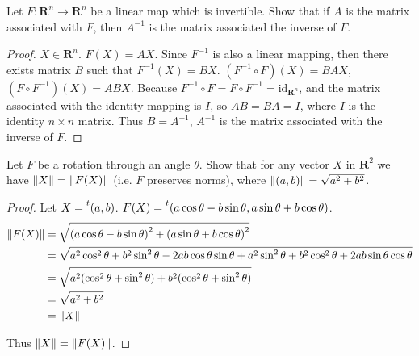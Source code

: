 \begin{exercise}
    Let $F: \mathbf{R}^{n} \to \mathbf{R}^{n}$ be a linear map which is invertible. Show that if $A$ is the matrix associated with $F$, then $A^{-1}$ is the matrix associated the inverse of $F$.
\end{exercise}

\begin{proof}
    $X\in\mathbf{R}^{n}$. $F(X) = AX$. Since $F^{-1}$ is also a linear mapping, then there exists matrix $B$ such that $F^{-1}(X) = BX$. $(F^{-1}\circ F)(X) = BAX$, $(F\circ F^{-1})(X) = ABX$. Because $F^{-1}\circ F = F\circ F^{-1} = \text{id}_{\mathbf{R}^{n}}$, and the matrix associated with the identity mapping is $I$, so $AB = BA = I$, where $I$ is the identity $n\times n$ matrix. Thus $B = A^{-1}$, $A^{-1}$ is the matrix associated with the inverse of $F$.
\end{proof}

\begin{exercise}
    Let $F$ be a rotation through an angle $\theta$. Show that for any vector $X$ in $\mathbf{R}^{2}$ we have $\left\Vert{X}\right\Vert = \left\Vert{F(X)}\right\Vert$ (i.e. $F$ preserves norms), where $\left\Vert{(a, b)}\right\Vert = \sqrt{a^{2} + b^{2}}$.
\end{exercise}

\begin{proof}
    Let $X = \prescript{t}{}(a, b)$. $F(X) = \prescript{t}{}(a\cos\theta - b\sin\theta, a\sin\theta + b\cos\theta)$.
    \begin{align*}
        \left\Vert{F(X)}\right\Vert & = \sqrt{{(a\cos\theta - b\sin\theta)}^{2} + {(a\sin\theta + b\cos\theta)}^{2}}                                                                     \\
                    & = \sqrt{a^{2}\cos^{2}\theta + b^{2}\sin^{2}\theta - 2ab\cos\theta\sin\theta + a^{2}\sin^{2}\theta + b^{2}\cos^{2}\theta + 2ab\sin\theta\cos\theta} \\
                    & = \sqrt{a^{2}(\cos^{2}\theta + \sin^{2}\theta) + b^{2}(\cos^{2}\theta + \sin^{2}\theta)}                                                           \\
                    & = \sqrt{a^{2} + b^{2}}                                                                                                                             \\
                    & = \left\Vert{X}\right\Vert
    \end{align*}

    Thus $\left\Vert{X}\right\Vert = \left\Vert{F(X)}\right\Vert$.
\end{proof}


